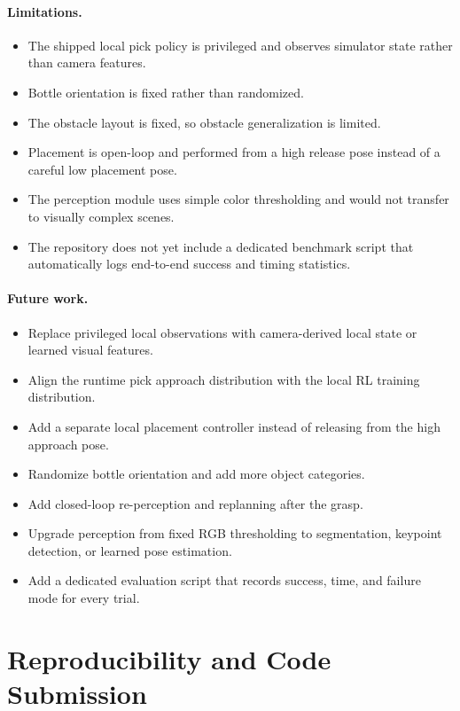 \documentclass[11pt]{article}
\begin{document}
\paragraph{Limitations.}
\begin{itemize}[leftmargin=*]
    \item The shipped local pick policy is privileged and observes simulator state rather than camera features.
    \item Bottle orientation is fixed rather than randomized.
    \item The obstacle layout is fixed, so obstacle generalization is limited.
    \item Placement is open-loop and performed from a high release pose instead of a careful low placement pose.
    \item The perception module uses simple color thresholding and would not transfer to visually complex scenes.
    \item The repository does not yet include a dedicated benchmark script that automatically logs end-to-end success and timing statistics.
\end{itemize}

\paragraph{Future work.}
\begin{itemize}[leftmargin=*]
    \item Replace privileged local observations with camera-derived local state or learned visual features.
    \item Align the runtime pick approach distribution with the local RL training distribution.
    \item Add a separate local placement controller instead of releasing from the high approach pose.
    \item Randomize bottle orientation and add more object categories.
    \item Add closed-loop re-perception and replanning after the grasp.
    \item Upgrade perception from fixed RGB thresholding to segmentation, keypoint detection, or learned pose estimation.
    \item Add a dedicated evaluation script that records success, time, and failure mode for every trial.
\end{itemize}

\section{Reproducibility and Code Submission}
\end{document}

